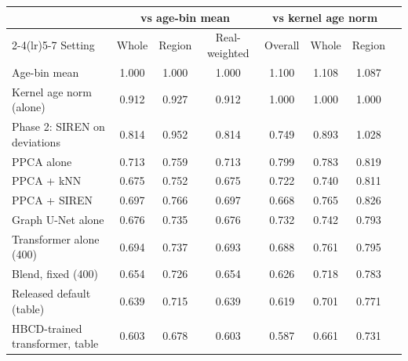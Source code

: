 \begin{tabular}{lccccccc}
\toprule
 & \multicolumn{3}{c}{vs age-bin mean} & \multicolumn{3}{c}{vs kernel age norm} \\
\cmidrule(lr){2-4}\cmidrule(lr){5-7}
Setting & Whole & Region & Real-weighted & Overall & Whole & Region \\
\midrule
Age-bin mean & 1.000 & 1.000 & 1.000 & 1.100 & 1.108 & 1.087 \\
Kernel age norm (alone) & 0.912 & 0.927 & 0.912 & 1.000 & 1.000 & 1.000 \\
Phase 2: SIREN on deviations & 0.814 & 0.952 & 0.814 & 0.749 & 0.893 & 1.028 \\
PPCA alone & 0.713 & 0.759 & 0.713 & 0.799 & 0.783 & 0.819 \\
PPCA + kNN & 0.675 & 0.752 & 0.675 & 0.722 & 0.740 & 0.811 \\
PPCA + SIREN & 0.697 & 0.766 & 0.697 & 0.668 & 0.765 & 0.826 \\
Graph U-Net alone & 0.676 & 0.735 & 0.676 & 0.732 & 0.742 & 0.793 \\
Transformer alone (400) & 0.694 & 0.737 & 0.693 & 0.688 & 0.761 & 0.795 \\
Blend, fixed (400) & 0.654 & 0.726 & 0.654 & 0.626 & 0.718 & 0.783 \\
Released default (table) & 0.639 & 0.715 & 0.639 & 0.619 & 0.701 & 0.771 \\
HBCD-trained transformer, table & 0.603 & 0.678 & 0.603 & 0.587 & 0.661 & 0.731 \\
\bottomrule
\end{tabular}
